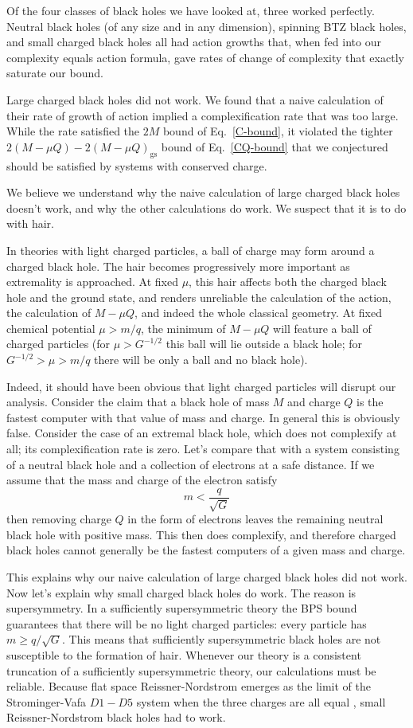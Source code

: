\documentclass[12pt]{article}
\numberwithin{equation}{section}
\newcommand{\be}{\begin{equation}}
\newcommand{\ee}{\end{equation}}
\begin{document}
Of the four classes of black holes we have looked at, three worked perfectly. Neutral black holes (of any size and in any dimension), spinning BTZ black holes, and small charged black holes all had action growths that, when fed into our complexity equals action formula, gave rates of change of complexity that exactly saturate our bound.

Large charged black holes did not work. We found that a naive calculation of their rate of growth of action implied a complexification rate that was too large. While the rate satisfied the $2M$ bound of Eq.~\ref{C-bound}, it violated the tighter $2(M - \mu Q) - 2(M - \mu Q)_\textrm{gs}$ bound of Eq.~\ref{CQ-bound} that we conjectured should be satisfied by systems with conserved charge.

We believe we understand why the naive calculation of large charged black holes doesn't work, and why the other calculations do work. We suspect that it is to do with hair.

In theories with light charged particles, a ball of charge may form around a charged black hole. The hair becomes progressively more important as extremality is approached. At fixed $\mu$, this hair affects both the charged black hole and the ground state, and renders unreliable the calculation of the action, the calculation of $M - \mu Q$, and indeed the whole classical geometry. At fixed chemical potential $\mu > m/q$, the minimum of $M - \mu Q$ will feature a ball of charged particles (for $\mu > G^{-1/2}$ this ball will lie outside a black hole; for $G^{-1/2}>\mu >m/q$ there will be only a ball and no black hole).


Indeed, it should have been obvious that light charged particles will disrupt our analysis. Consider the claim that a black hole of mass $M$ and charge $Q$ is the fastest computer with that value of mass and charge.  In general this is obviously false.  Consider the case of an extremal black hole, which does not complexify at all; its complexification rate is zero. Let's compare that with a system consisting of a neutral black hole and a collection of electrons at a safe distance.  If we assume that the mass  and charge of the electron satisfy
\be
m< \frac{q}{\sqrt{G}}
\ee
then removing charge $Q$ in the form of electrons leaves the remaining neutral black hole with positive mass. This then does complexify, and therefore  charged black holes cannot generally be the fastest computers of a given mass and charge.

This explains why  our naive calculation of large charged black holes did not work. Now let's explain why small charged black holes  do work.  The reason is supersymmetry. In a sufficiently supersymmetric theory the BPS bound guarantees that there will be no light charged particles: every particle has $m \geq q /\sqrt{G}$. This means that sufficiently supersymmetric black holes are not susceptible to the formation of hair. Whenever our theory is a consistent truncation of a sufficiently supersymmetric theory, our calculations must be reliable.
Because flat space Reissner-Nordstrom emerges as the limit of the Strominger-Vafa \cite{StromingerVafa96}  $D1-D5$ system when the three charges are all equal \cite{CallanMaldacena96}, small Reissner-Nordstrom black holes had to work.
\end{document}
